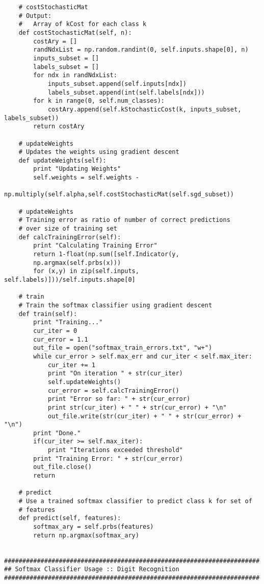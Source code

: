 \documentclass{article}
\begin{document}
\begin{spacing}{1.1}
\begin{lstlisting}
    # costStochasticMat
    # Output:
    #   Array of kCost for each class k
    def costStochasticMat(self, n): 
        costAry = []
        randNdxList = np.random.randint(0, self.inputs.shape[0], n)
        inputs_subset = []
        labels_subset = []
        for ndx in randNdxList:
            inputs_subset.append(self.inputs[ndx])
            labels_subset.append(int(self.labels[ndx]))
        for k in range(0, self.num_classes):
            costAry.append(self.kStochasticCost(k, inputs_subset, labels_subset))
        return costAry

    # updateWeights
    # Updates the weights using gradient descent
    def updateWeights(self):
        print "Updating Weights"
        self.weights = self.weights - 
        np.multiply(self.alpha,self.costStochasticMat(self.sgd_subset))

    # updateWeights
    # Training error as ratio of number of correct predictions 
    # over size of training set
    def calcTrainingError(self):
        print "Calculating Training Error"
        return 1-float(np.sum([self.Indicator(y, 
        np.argmax(self.prbs(x))) 
        for (x,y) in zip(self.inputs, self.labels)]))/self.inputs.shape[0]

    # train
    # Train the softmax classifier using gradient descent
    def train(self):
        print "Training..."
        cur_iter = 0
        cur_error = 1.1
        out_file = open("softmax_train_errors.txt", "w+")
        while cur_error > self.max_err and cur_iter < self.max_iter:
            cur_iter += 1
            print "On iteration " + str(cur_iter)
            self.updateWeights()
            cur_error = self.calcTrainingError()
            print "Error so far: " + str(cur_error)
            print str(cur_iter) + " " + str(cur_error) + "\n"
            out_file.write(str(cur_iter) + " " + str(cur_error) + "\n")
        print "Done."
        if(cur_iter >= self.max_iter):
            print "Iterations exceeded threshold"
        print "Training Error: " + str(cur_error) 
        out_file.close()
        return

    # predict
    # Use a trained softmax classifier to predict class k for set of 
    # features
    def predict(self, features):
        softmax_ary = self.prbs(features)
        return np.argmax(softmax_ary)


######################################################################
## Softmax Classifier Usage :: Digit Recognition
######################################################################


\end{lstlisting}
\end{spacing}
\end{document}
